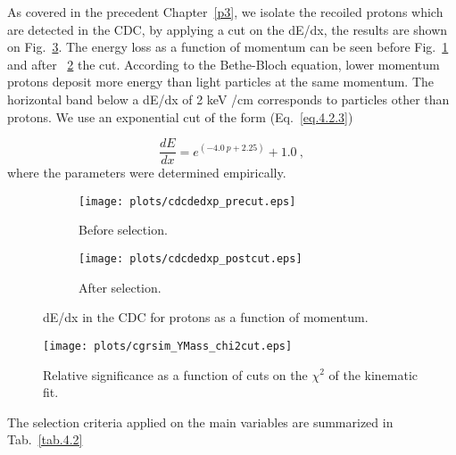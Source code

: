 As covered in the precedent Chapter~\ref{p3}, we isolate the recoiled protons which are detected in the CDC, by applying a cut on the dE/dx, the results are shown on Fig.~\ref{fig.4.2.2}. The energy loss as a function of momentum can be seen before Fig.~\ref{fig.4.2.2.a} and after ~\ref{fig.4.2.2.b} the cut. According to the Bethe-Bloch equation, lower momentum protons deposit more energy than light particles at the same momentum. The horizontal band below a dE/dx of 2 keV /cm corresponds to particles other than protons. We use an exponential cut of the form (Eq.~\ref{eq.4.2.3})

\begin{equation}
    \label{eq.4.2.3}
    \frac{dE}{dx} =  e^{(-4.0~p + 2.25)} + 1.0~,
\end{equation}
where the parameters were determined empirically.
 
\begin{figure}[H]
    \centering
    \begin{subfigure}[b]{0.45\textwidth}
        \texttt{[image: plots/cdcdedxp\_precut.eps]}
        \caption{Before selection.}
        \label{fig.4.2.2.a}
    \end{subfigure}\hfill
    \begin{subfigure}[b]{0.45\textwidth}
        \texttt{[image: plots/cdcdedxp\_postcut.eps]}
        \caption{After selection.}
        \label{fig.4.2.2.b}
    \end{subfigure}\hfill
    \caption{dE/dx in the CDC for protons as a function of momentum.}
    \label{fig.4.2.2}
\end{figure}


\begin{figure}[H]
    \centering
        \texttt{[image: plots/cgrsim\_YMass\_chi2cut.eps]}
        \caption{Relative significance as a function of cuts on the $\chi^{2}$ of the kinematic fit.}
        \label{fig.4.2.3}
\end{figure}

The selection criteria applied on the main variables are summarized in Tab.~\ref{tab.4.2}

